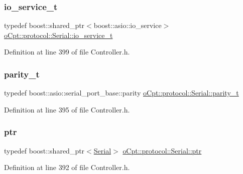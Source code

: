 \subsubsection{\texorpdfstring{io\+\_\+service\+\_\+t}{io\_service\_t}}
{\footnotesize\ttfamily typedef boost\+::shared\+\_\+ptr$<$boost\+::asio\+::io\+\_\+service$>$ \hyperlink{classo_cpt_1_1protocol_1_1_serial_ac9305799ef4be4eb50f1274184492f04}{o\+Cpt\+::protocol\+::\+Serial\+::io\+\_\+service\+\_\+t}}



Definition at line 399 of file Controller.\+h.

\hypertarget{classo_cpt_1_1protocol_1_1_serial_aae21a39fe2f321475ca19d46bf40d5f3}{}\label{classo_cpt_1_1protocol_1_1_serial_aae21a39fe2f321475ca19d46bf40d5f3} 
\subsubsection{\texorpdfstring{parity\+\_\+t}{parity\_t}}
{\footnotesize\ttfamily typedef boost\+::asio\+::serial\+\_\+port\+\_\+base\+::parity \hyperlink{classo_cpt_1_1protocol_1_1_serial_aae21a39fe2f321475ca19d46bf40d5f3}{o\+Cpt\+::protocol\+::\+Serial\+::parity\+\_\+t}}



Definition at line 395 of file Controller.\+h.

\hypertarget{classo_cpt_1_1protocol_1_1_serial_a4c97c6a2456d649974e07a186f634780}{}\label{classo_cpt_1_1protocol_1_1_serial_a4c97c6a2456d649974e07a186f634780} 
\subsubsection{\texorpdfstring{ptr}{ptr}}
{\footnotesize\ttfamily typedef boost\+::shared\+\_\+ptr$<$\hyperlink{classo_cpt_1_1protocol_1_1_serial}{Serial}$>$ \hyperlink{classo_cpt_1_1protocol_1_1_serial_a4c97c6a2456d649974e07a186f634780}{o\+Cpt\+::protocol\+::\+Serial\+::ptr}}



Definition at line 392 of file Controller.\+h.

\hypertarget{classo_cpt_1_1protocol_1_1_serial_a3949fae08041279672bcb29b94d4cd52}{}\label{classo_cpt_1_1protocol_1_1_serial_a3949fae08041279672bcb29b94d4cd52} 
